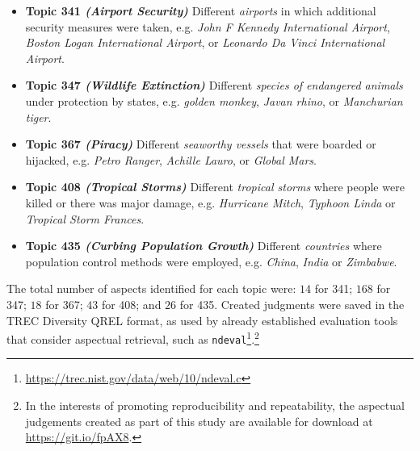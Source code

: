 \begin{itemize}
    \item{\textbf{Topic 341 \emph{(Airport Security)}} Different \emph{airports} in which additional security measures were taken, e.g. \emph{John F Kennedy International Airport}, \emph{Boston Logan International Airport}, or \emph{Leonardo Da Vinci International Airport}.}
    \item{\textbf{Topic 347 \emph{(Wildlife Extinction)}} Different \emph{species of endangered animals} under protection by states, e.g. \emph{golden monkey}, \emph{Javan rhino}, or \emph{Manchurian tiger}.}
    \item{\textbf{Topic 367 \emph{(Piracy)}} Different \emph{seaworthy vessels} that were boarded or hijacked, e.g. \emph{Petro Ranger}, \emph{Achille Lauro}, or \emph{Global Mars}.}
    \item{\textbf{Topic 408 \emph{(Tropical Storms)}} Different \emph{tropical storms} where people were killed or there was major damage, e.g. \emph{Hurricane Mitch}, \emph{Typhoon Linda} or \emph{Tropical Storm Frances}.}
    \item{\textbf{Topic 435 \emph{(Curbing Population Growth)}} Different \emph{countries} where population control methods were employed, e.g. \emph{China}, \emph{India} or \emph{Zimbabwe}.}
\end{itemize}

The total number of aspects identified for each topic were: $14$ for 341; $168$ for 347; $18$ for 367; $43$ for 408; and $26$ for 435. Created judgments were saved in the TREC Diversity QREL format, as used by already established evaluation tools that consider aspectual retrieval, such as \texttt{ndeval}\footnote{\url{https://trec.nist.gov/data/web/10/ndeval.c}}.\footnote{In the interests of promoting reproducibility and repeatability, the aspectual judgements created as part of this study are available for download at \url{https://git.io/fpAX8}.} %


